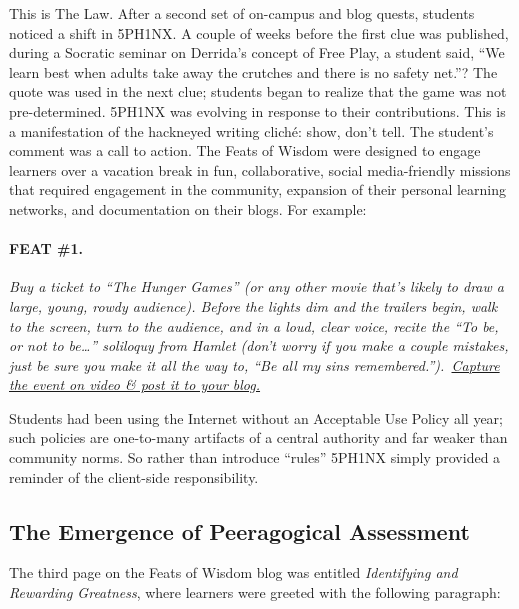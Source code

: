 This is The Law. After a second set of on-campus and blog quests,
students noticed a shift in 5PH1NX. A couple of weeks before the first
clue was published, during a Socratic seminar on Derrida's concept of
Free Play, a student said, ``We learn best when adults take away the
crutches and there is no safety net.''? The quote was used in the next
clue; students began to realize that the game was not pre-determined.
5PH1NX was evolving in response to their contributions. This is a
manifestation of the hackneyed writing cliché: show, don't tell. The
student's comment was a call to action. The Feats of Wisdom were
designed to engage learners over a vacation break in fun, collaborative,
social media-friendly missions that required engagement in the
community, expansion of their personal learning networks, and
documentation on their blogs. For example:

\paragraph{FEAT \#1.}\label{feat-1.}

\emph{Buy a ticket to ``The Hunger Games'' (or any other movie that's
likely to draw a large, young, rowdy audience). Before the lights dim
and the trailers begin, walk to the screen, turn to the audience, and in
a loud, clear voice, recite the ``To be, or not to be\ldots{}''
soliloquy from Hamlet (don't worry if you make a couple mistakes, just
be sure you make it all the way to, ``Be all my sins
remembered.'').~\href{http://alarhsenglitcomp.blogspot.com/2012/12/feats-of-wisdom-1_15.html}{Capture
the event on video \& post it to your blog.}}

\smallskip

Students had been using the Internet without an Acceptable Use Policy
all year; such policies are one-to-many artifacts of a central authority
and far weaker than community norms. So rather than introduce ``rules''
5PH1NX simply provided a reminder of the client-side responsibility.

\subsection{The Emergence of Peeragogical
Assessment}\label{the-emergence-of-peeragogical-assessment}

The third page on the Feats of Wisdom blog was entitled
\emph{Identifying and Rewarding Greatness}, where learners were greeted
with the following paragraph:

